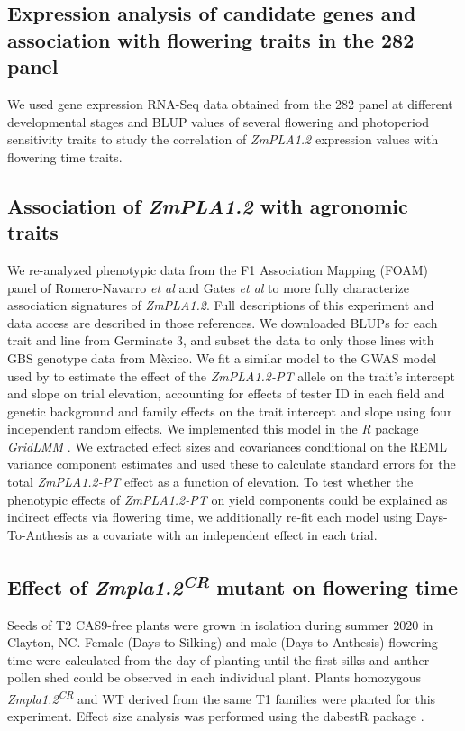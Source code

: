 \documentclass[9pt,twocolumn,twoside,lineno]{BioRxiv}
\begin{document}
\subsection{Expression analysis of candidate genes and association with flowering traits in the 282 panel}

We used gene expression RNA-Seq data obtained from the 282 panel at different developmental stages \cite{Kremling2018-gn} and BLUP values of several flowering and photoperiod sensitivity traits \cite{Hung2012-ms} to study the correlation of \textit{ZmPLA1.2} expression values with flowering time traits.  


\subsection{Association of \textit{ZmPLA1.2} with agronomic traits}

We re-analyzed phenotypic data from the F1 Association Mapping (FOAM) panel of Romero-Navarro \textit{et al} \cite{Romero_Navarro2017-cn} and Gates \textit{et al} \cite{Gates2019-xu} to more fully characterize association signatures of \textit{ZmPLA1.2}. 
Full descriptions of this experiment and data access are described in those references. 
We downloaded BLUPs for each trait and line from Germinate 3, and subset the data to only those lines with GBS genotype data from M\`exico. 
We fit a similar model to the GWAS model used by \cite{Gates2019-xu} to estimate the effect of the \textit{ZmPLA1.2-PT} allele on the trait's intercept and slope on trial elevation, accounting for effects of tester ID in each field and genetic background and family effects on the trait intercept and slope using four independent random effects. 
We implemented this model in the \textit{R} package \textit{GridLMM} \cite{Runcie2019-Gr}. 
We extracted effect sizes and covariances conditional on the REML variance component estimates and used these to calculate standard errors for the total \textit{ZmPLA1.2-PT} effect as a function of elevation. 
To test whether the phenotypic effects of \textit{ZmPLA1.2-PT} on yield components could be explained as indirect effects via flowering time, we additionally re-fit each model using Days-To-Anthesis as a covariate with an independent effect in each trial.

\subsection{Effect of \textit{Zmpla1.2\textsuperscript{CR}} mutant on flowering time}
Seeds of T2 CAS9-free plants were grown in isolation during summer 2020 in Clayton, NC. 
Female (Days to Silking) and male (Days to Anthesis) flowering time were calculated from the day of planting until the first silks and anther pollen shed could be observed in each individual plant. 
Plants homozygous \textit{Zmpla1.2\textsuperscript{CR}} and WT derived from the same T1 families were planted for this experiment. 
Effect size analysis was performed using the dabestR package \cite{Ho2019-yl}.
\end{document}
